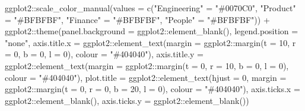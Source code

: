 \documentclass[
]{book}
\newenvironment{Shaded}{\begin{snugshade}}{\end{snugshade}}
\newcommand{\AttributeTok}[1]{\textcolor[rgb]{0.77,0.63,0.00}{#1}}
\newcommand{\DecValTok}[1]{\textcolor[rgb]{0.00,0.00,0.81}{#1}}
\newcommand{\FunctionTok}[1]{\textcolor[rgb]{0.00,0.00,0.00}{#1}}
\newcommand{\NormalTok}[1]{#1}
\newcommand{\OtherTok}[1]{\textcolor[rgb]{0.56,0.35,0.01}{#1}}
\newcommand{\SpecialCharTok}[1]{\textcolor[rgb]{0.00,0.00,0.00}{#1}}
\newcommand{\StringTok}[1]{\textcolor[rgb]{0.31,0.60,0.02}{#1}}
\begin{document}
\begin{Shaded}
\begin{Highlighting}[]
\NormalTok{ggplot2}\SpecialCharTok{::}\FunctionTok{scale\_color\_manual}\NormalTok{(}\AttributeTok{values =} \FunctionTok{c}\NormalTok{(}\StringTok{"Engineering"} \OtherTok{=} \StringTok{"\#0070C0"}\NormalTok{,}
                                       \StringTok{"Product"} \OtherTok{=} \StringTok{"\#BFBFBF"}\NormalTok{,}
                                       \StringTok{"Finance"} \OtherTok{=} \StringTok{"\#BFBFBF"}\NormalTok{,}
                                       \StringTok{"People"} \OtherTok{=} \StringTok{"\#BFBFBF"}\NormalTok{)) }\SpecialCharTok{+}
\NormalTok{ggplot2}\SpecialCharTok{::}\FunctionTok{theme}\NormalTok{(}\AttributeTok{panel.background =}\NormalTok{ ggplot2}\SpecialCharTok{::}\FunctionTok{element\_blank}\NormalTok{(),}
               \AttributeTok{legend.position =} \StringTok{"none"}\NormalTok{,}
               \AttributeTok{axis.title.x =}\NormalTok{ ggplot2}\SpecialCharTok{::}\FunctionTok{element\_text}\NormalTok{(}\AttributeTok{margin =}\NormalTok{ ggplot2}\SpecialCharTok{::}\FunctionTok{margin}\NormalTok{(}\AttributeTok{t =} \DecValTok{10}\NormalTok{, }\AttributeTok{r =} \DecValTok{0}\NormalTok{, }\AttributeTok{b =} \DecValTok{0}\NormalTok{, }\AttributeTok{l =} \DecValTok{0}\NormalTok{), }\AttributeTok{colour =} \StringTok{"\#404040"}\NormalTok{),}
               \AttributeTok{axis.title.y =}\NormalTok{ ggplot2}\SpecialCharTok{::}\FunctionTok{element\_text}\NormalTok{(}\AttributeTok{margin =}\NormalTok{ ggplot2}\SpecialCharTok{::}\FunctionTok{margin}\NormalTok{(}\AttributeTok{t =} \DecValTok{0}\NormalTok{, }\AttributeTok{r =} \DecValTok{10}\NormalTok{, }\AttributeTok{b =} \DecValTok{0}\NormalTok{, }\AttributeTok{l =} \DecValTok{0}\NormalTok{), }\AttributeTok{colour =} \StringTok{"\#404040"}\NormalTok{),}
               \AttributeTok{plot.title =}\NormalTok{ ggplot2}\SpecialCharTok{::}\FunctionTok{element\_text}\NormalTok{(}\AttributeTok{hjust =} \DecValTok{0}\NormalTok{, }\AttributeTok{margin =}\NormalTok{ ggplot2}\SpecialCharTok{::}\FunctionTok{margin}\NormalTok{(}\AttributeTok{t =} \DecValTok{0}\NormalTok{, }\AttributeTok{r =} \DecValTok{0}\NormalTok{, }\AttributeTok{b =} \DecValTok{20}\NormalTok{, }\AttributeTok{l =} \DecValTok{0}\NormalTok{), }\AttributeTok{colour =} \StringTok{"\#404040"}\NormalTok{),}
               \AttributeTok{axis.ticks.x =}\NormalTok{ ggplot2}\SpecialCharTok{::}\FunctionTok{element\_blank}\NormalTok{(),}
               \AttributeTok{axis.ticks.y =}\NormalTok{ ggplot2}\SpecialCharTok{::}\FunctionTok{element\_blank}\NormalTok{())}
\end{Highlighting}
\end{Shaded}
\end{document}
